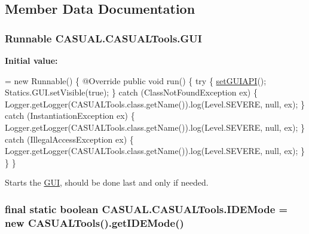 \subsection{Member Data Documentation}
\hypertarget{class_c_a_s_u_a_l_1_1_c_a_s_u_a_l_tools_a06e15c1a4ff6aaf8b3b81ff74afb5e2d}{
\subsubsection[{G\-U\-I}]{\setlength{\rightskip}{0pt plus 5cm}Runnable C\-A\-S\-U\-A\-L.\-C\-A\-S\-U\-A\-L\-Tools.\-G\-U\-I}}\label{class_c_a_s_u_a_l_1_1_c_a_s_u_a_l_tools_a06e15c1a4ff6aaf8b3b81ff74afb5e2d}
{\bfseries Initial value\-:}
\begin{DoxyCode}
= \textcolor{keyword}{new} Runnable() \{
        @Override
        \textcolor{keyword}{public} \textcolor{keywordtype}{void} run() \{
            \textcolor{keywordflow}{try} \{
                \hyperlink{class_c_a_s_u_a_l_1_1_c_a_s_u_a_l_tools_a3d11cab02790b7080883bde3748f8d59}{setGUIAPI}();
                Statics.GUI.setVisible(\textcolor{keyword}{true});
            \} \textcolor{keywordflow}{catch} (ClassNotFoundException ex) \{
                Logger.getLogger(CASUALTools.class.getName()).log(Level.SEVERE, null, ex);
            \} \textcolor{keywordflow}{catch} (InstantiationException ex) \{
                Logger.getLogger(CASUALTools.class.getName()).log(Level.SEVERE, null, ex);
            \} \textcolor{keywordflow}{catch} (IllegalAccessException ex) \{
                Logger.getLogger(CASUALTools.class.getName()).log(Level.SEVERE, null, ex);
            \}
        \}
    \}
\end{DoxyCode}
Starts the \hyperlink{namespace_c_a_s_u_a_l_1_1_g_u_i}{G\-U\-I}, should be done last and only if needed. \hypertarget{class_c_a_s_u_a_l_1_1_c_a_s_u_a_l_tools_a67fc8cae52fef252e4fff29730a415a2}{
\subsubsection[{I\-D\-E\-Mode}]{\setlength{\rightskip}{0pt plus 5cm}final static boolean C\-A\-S\-U\-A\-L.\-C\-A\-S\-U\-A\-L\-Tools.\-I\-D\-E\-Mode = new {\bf C\-A\-S\-U\-A\-L\-Tools}().get\-I\-D\-E\-Mode()\hspace{0.3cm}{\ttfamily [static]}}}\label{class_c_a_s_u_a_l_1_1_c_a_s_u_a_l_tools_a67fc8cae52fef252e4fff29730a415a2}
